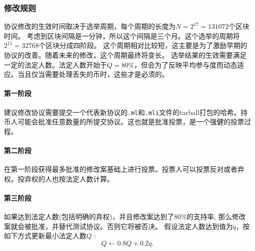 \documentclass[letterpaper]{article}
\begin{document}
\subsubsection{修改规则}
 协议修改的生效时间取决于选举周期，每个周期的长度为$N = 2^{17} = \num{131072}$个区块时间。
 考虑到区块间隔是一分钟，所以这个间隔是三个月。这个选举的周期将$2^{15} = \num{32768}$个区块分成四阶段。
这个周期相对比较短，这主要是为了激励早期的协议的改善。随着未来的修改，这个周期最终将变长。
选举结果的生效需要满足一定的法定人数。法定人数开始于$Q = 80\%$，但会为了反映平均参与度而动态适应。当且仅当需要处理丢失的币时，这些才是必须的。

\paragraph{第一阶段}
建议修改协议需要提交一个代表新协议的\verb!.ml!和\verb!.mli!文件的tarball打包的哈希。持币人可能会批准任意数量的所提交协议。这也就是批准投票，是一个强健的投票过程。

\paragraph{第二阶段}
在第一阶段获得最多批准的修改案基础上进行投票。投票人可以投票反对或者弃权。投弃权的人也按法定人数计算。

\paragraph{第三阶段} %
如果达到法定人数(包括明确的弃权)，并且修改案达到了$80\%$的支持率, 那么修改案就会被批准，并替代测试协议。否则它将被否决。
假设法定人数达到值为$q$，按如下方式更新最小法定人数$Q$ :
$$Q \leftarrow 0.8 Q + 0.2 q.$$
\end{document}
